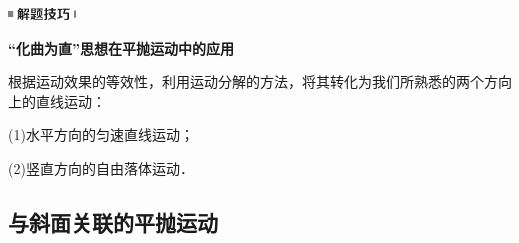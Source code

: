 \documentclass[cn,10.5pt,chinese,mac,chinesefont=founder]{elegantbook}
\begin{document}
\begin{center}\includegraphics[width=0.70833in,height=0.125in]{media/image37.png}

\textbf{``化曲为直''思想在平抛运动中的应用}
\end{center}


根据运动效果的等效性，利用运动分解的方法，将其转化为我们所熟悉的两个方向上的直线运动：

(1)水平方向的匀速直线运动；

(2)竖直方向的自由落体运动．

\newpage
\subsection{与斜面关联的平抛运动}
\end{document}
